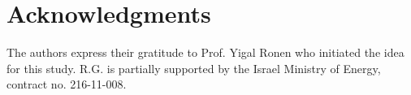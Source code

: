%
\section*{Acknowledgments}
\label{sec:acknow}

The authors express their gratitude to Prof. Yigal Ronen who initiated the idea for this study. R.G. is partially supported by the Israel Ministry of Energy, contract no. 216-11-008. 


	

%







